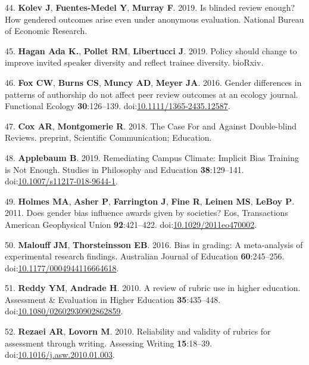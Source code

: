 \documentclass[11pt,]{article}
\begin{document}
\hypertarget{ref-Kolev2019}{}
44. \textbf{Kolev J}, \textbf{Fuentes-Medel Y}, \textbf{Murray F}. 2019.
Is blinded review enough? How gendered outcomes arise even under
anonymous evaluation. National Bureau of Economic Research.

\hypertarget{ref-Hagan_2019}{}
45. \textbf{Hagan \textnormal{Ada K.}}, \textbf{Pollet RM},
\textbf{Libertucci J}. 2019. Policy should change to improve invited
speaker diversity and reflect trainee diversity. bioRxiv.

\hypertarget{ref-fox_gender_2016}{}
46. \textbf{Fox CW}, \textbf{Burns CS}, \textbf{Muncy AD}, \textbf{Meyer
JA}. 2016. Gender differences in patterns of authorship do not affect
peer review outcomes at an ecology journal. Functional Ecology
\textbf{30}:126--139.
doi:\href{https://doi.org/10.1111/1365-2435.12587}{10.1111/1365-2435.12587}.

\hypertarget{ref-cox_case_2018}{}
47. \textbf{Cox AR}, \textbf{Montgomerie R}. 2018. The Case For and
Against Double-blind Reviews. preprint, Scientific Communication;
Education.

\hypertarget{ref-applebaum_remediating_2019}{}
48. \textbf{Applebaum B}. 2019. Remediating Campus Climate: Implicit
Bias Training is Not Enough. Studies in Philosophy and Education
\textbf{38}:129--141.
doi:\href{https://doi.org/10.1007/s11217-018-9644-1}{10.1007/s11217-018-9644-1}.

\hypertarget{ref-Holmes2011}{}
49. \textbf{Holmes MA}, \textbf{Asher P}, \textbf{Farrington J},
\textbf{Fine R}, \textbf{Leinen MS}, \textbf{LeBoy P}. 2011. Does gender
bias influence awards given by societies? Eos, Transactions American
Geophysical Union \textbf{92}:421--422.
doi:\href{https://doi.org/10.1029/2011eo470002}{10.1029/2011eo470002}.

\hypertarget{ref-Malouff2016}{}
50. \textbf{Malouff JM}, \textbf{Thorsteinsson EB}. 2016. Bias in
grading: A meta-analysis of experimental research findings. Australian
Journal of Education \textbf{60}:245--256.
doi:\href{https://doi.org/10.1177/0004944116664618}{10.1177/0004944116664618}.

\hypertarget{ref-Reddy2010}{}
51. \textbf{Reddy YM}, \textbf{Andrade H}. 2010. A review of rubric use
in higher education. Assessment \& Evaluation in Higher Education
\textbf{35}:435--448.
doi:\href{https://doi.org/10.1080/02602930902862859}{10.1080/02602930902862859}.

\hypertarget{ref-Rezaei2010}{}
52. \textbf{Rezaei AR}, \textbf{Lovorn M}. 2010. Reliability and
validity of rubrics for assessment through writing. Assessing Writing
\textbf{15}:18--39.
doi:\href{https://doi.org/10.1016/j.asw.2010.01.003}{10.1016/j.asw.2010.01.003}.
\end{document}
